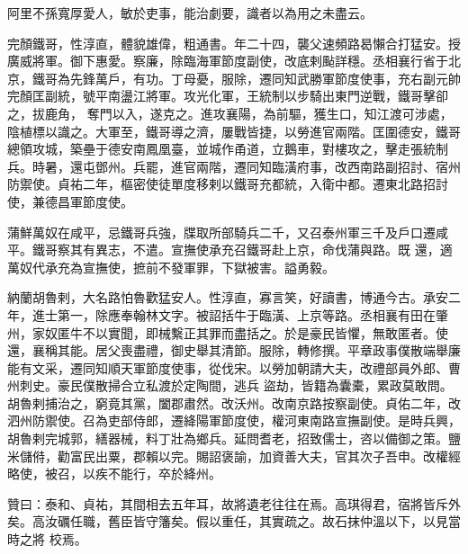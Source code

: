\begin{pinyinscope}
 阿里不孫寬厚愛人，敏於吏事，能治劇要，識者以為用之未盡云。



 完顏鐵哥，性淳直，體貌雄偉，粗通書。年二十四，襲父速頻路曷懶合打猛安。授廣威將軍。御下惠愛。察廉，除臨海軍節度副使，改底剌颭詳穩。丞相襄行省于北京，鐵哥為先鋒萬戶，有功。丁母憂，服除，遷同知武勝軍節度使事，充右副元帥完顏匡副統，號平南盪江將軍。攻光化軍，王統制以步騎出東門逆戰，鐵哥擊卻之，拔鹿角，
 奪門以入，遂克之。進攻襄陽，為前驅，獲生口，知江渡可涉處，陰植標以識之。大軍至，鐵哥導之濟，屢戰皆捷，以勞進官兩階。匡圍德安，鐵哥總領攻城，築壘于德安南鳳凰臺，並城作甬道，立鵝車，對樓攻之，擊走張統制兵。時暑，還屯鄧州。兵罷，進官兩階，遷同知臨潢府事，改西南路副招討、宿州防禦使。貞祐二年，樞密使徒單度移剌以鐵哥充都統，入衛中都。遷東北路招討使，兼德昌軍節度使。



 蒲鮮萬奴在咸平，忌鐵哥兵強，牒取所部騎兵二千，又召泰州軍三千及戶口遷咸平。鐵哥察其有異志，不遣。宣撫使承充召鐵哥赴上京，命伐蒲與路。既
 還，適萬奴代承充為宣撫使，摭前不發軍罪，下獄被害。謚勇毅。



 納蘭胡魯剌，大名路怕魯歡猛安人。性淳直，寡言笑，好讀書，博通今古。承安二年，進士第一，除應奉翰林文字。被詔括牛于臨潢、上京等路。丞相襄有田在肇州，家奴匿牛不以實聞，即械繫正其罪而盡括之。於是豪民皆懼，無敢匿者。使還，襄稱其能。居父喪盡禮，御史舉其清節。服除，轉修撰。平章政事僕散端舉廉能有文采，遷同知順天軍節度使事，從伐宋。以勞加朝請大夫，改禮部員外郎、曹州刺史。豪民僕散掃合立私渡於定陶間，逃兵
 盜劫，皆籍為囊橐，累政莫敢問。胡魯剌捕治之，窮竟其黨，闔郡肅然。改沃州。改南京路按察副使。貞佑二年，改泗州防禦使。召為吏部侍郎，遷絳陽軍節度使，權河東南路宣撫副使。是時兵興，胡魯剌完城郭，繕器械，料丁壯為鄉兵。延問耆老，招致儒士，咨以備御之策。鹽米儲偫，勸富民出粟，郡賴以完。賜詔褒諭，加資善大夫，官其次子吾申。改權經略使，被召，以疾不能行，卒於絳州。



 贊曰：泰和、貞祐，其間相去五年耳，故將遺老往往在焉。高琪得君，宿將皆斥外矣。高汝礪任職，舊臣皆守籓矣。假以重任，其實疏之。故石抹仲溫以下，以見當時之將
 校焉。



\end{pinyinscope}